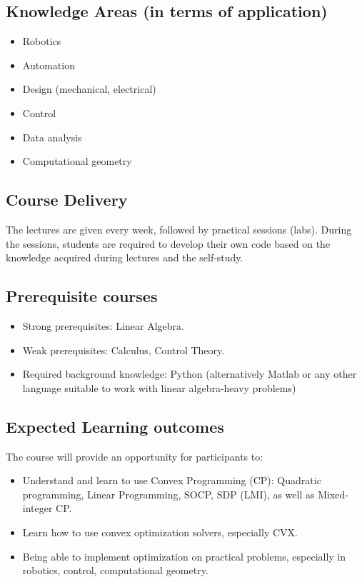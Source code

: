 

\subsection{Knowledge Areas (in terms of application)}

\begin{itemize}
    \item Robotics
    \item Automation
    \item Design (mechanical, electrical)
    \item Control
    \item Data analysis
    \item Computational geometry
\end{itemize}

\subsection{Course Delivery}

The lectures are given every week, followed by practical sessions (labs). During the sessions, students are required to develop their own code based on the knowledge acquired during lectures and the self-study.

\subsection{Prerequisite courses}

\begin{itemize}
    \item Strong prerequisites: Linear Algebra.
    \item Weak prerequisites: Calculus, Control Theory.
    \item Required background knowledge: Python (alternatively Matlab or any other language suitable to work with linear algebra-heavy problems) 
\end{itemize}

\subsection{Expected Learning outcomes}

The course will provide an opportunity for participants to:
\begin{itemize}
    \item Understand and learn to use Convex Programming (CP): Quadratic programming, Linear Programming, SOCP, SDP (LMI), as well as Mixed-integer CP.
    \item Learn how to use convex optimization solvers, especially CVX.
    \item Being able to implement optimization on practical problems, especially in robotics, control, computational geometry.
\end{itemize}

